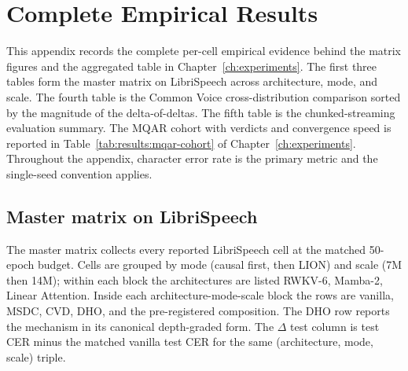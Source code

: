 \chapter{Complete Empirical Results}\label{app:results}

This appendix records the complete per-cell empirical evidence behind
the matrix figures and the aggregated table in
Chapter~\ref{ch:experiments}. The first three tables form the master
matrix on LibriSpeech across architecture, mode, and scale. The
fourth table is the Common Voice cross-distribution comparison
sorted by the magnitude of the delta-of-deltas. The fifth table is
the chunked-streaming evaluation summary. The MQAR cohort with
verdicts and convergence speed is reported in
Table~\ref{tab:results:mqar-cohort} of
Chapter~\ref{ch:experiments}. Throughout the appendix, character
error rate is the primary metric and the single-seed convention
applies.

\section{Master matrix on LibriSpeech}\label{app:results:master}

The master matrix collects every reported LibriSpeech cell at the
matched 50-epoch budget. Cells are grouped by mode (causal first,
then LION) and scale (7M then 14M); within each block the
architectures are listed RWKV-6, Mamba-2, Linear Attention. Inside
each architecture-mode-scale block the rows are vanilla, MSDC, CVD,
DHO, and the pre-registered composition. The DHO row reports the
mechanism in its canonical depth-graded form. The $\Delta$ test
column is test CER minus the matched vanilla test CER for the same
(architecture, mode, scale) triple.

